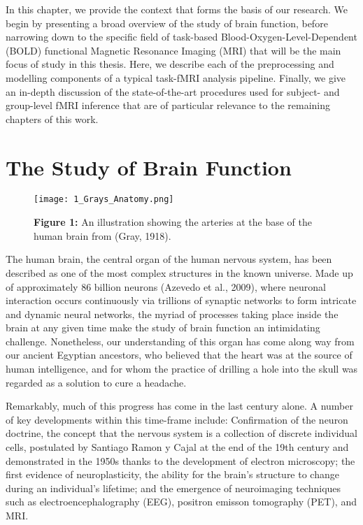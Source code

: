 In this chapter, we provide the context that forms the basis of our research. We begin by presenting a broad overview of the study of brain function, before narrowing down to the specific field of task-based Blood-Oxygen-Level-Dependent (BOLD) functional Magnetic Resonance Imaging (MRI) that will be the main focus of study in this thesis. Here, we describe each of the preprocessing and modelling components of a typical task-fMRI analysis pipeline. Finally, we give an in-depth discussion of the state-of-the-art procedures used for subject- and group-level fMRI inference that are of particular relevance to the remaining chapters of this work. 

\pagebreak

\section{The Study of Brain Function}

\begin{figure}[htbp]
\centering
	\texttt{[image: 1\_Grays\_Anatomy.png]}	
\caption*{\textbf{Figure 1:} An illustration showing the arteries at the base of the human brain from (Gray, 1918).}
\end{figure}

The human brain, the central organ of the human nervous system, has been described as one of the most complex structures in the known universe. Made up of approximately 86 billion neurons (Azevedo et al., 2009), where neuronal interaction occurs continuously via trillions of synaptic networks to form intricate and dynamic neural networks, the myriad of processes taking place inside the brain at any given time make the study of brain function an intimidating challenge. Nonetheless, our understanding of this organ has come along way from our ancient Egyptian ancestors, who believed that the heart was at the source of human intelligence, and for whom the practice of drilling a hole into the skull was regarded as a solution to cure a headache. 

Remarkably, much of this progress has come in the last century alone. A number of key developments within this time-frame include: Confirmation of the neuron doctrine, the concept that the nervous system is a collection of discrete individual cells, postulated by Santiago Ramon y Cajal at the end of the 19th century and demonstrated in the 1950s thanks to the development of electron microscopy; the first evidence of neuroplasticity, the ability for the brain's structure to change during an individual's lifetime; and the emergence of neuroimaging techniques such as electroencephalography (EEG), positron emisson tomography (PET), and MRI.    

